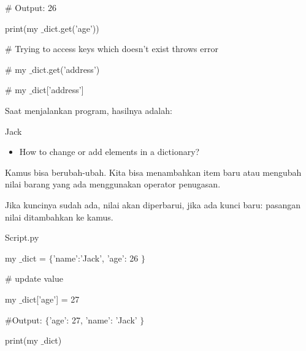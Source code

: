 \noindent 
 \hspace*{0.5in}  $  \#  $ Output: 26 \par
\noindent 
 \hspace*{0.5in} print(my $  \_  $dict.get('age')) \par
\noindent 
 \hspace*{0.5in}  $  \#  $ Trying to access keys which doesn't exist throws error \par
\noindent 
 \hspace*{0.5in}  $  \#  $ my $  \_  $dict.get('address') \par
\noindent 
 \hspace*{0.5in}  $  \#  $ my $  \_  $dict['address'] \par
\noindent 
Saat menjalankan program, hasilnya adalah: \par
\noindent 
Jack \par
{} \par
\vspace{12pt}
\noindent 
\begin{itemize}
	\item How to change or add elements in a dictionary? \par
\end{itemize}
\noindent 
Kamus bisa berubah-ubah. Kita bisa menambahkan item baru atau mengubah nilai barang yang ada menggunakan operator penugasan. \par
\noindent 
Jika kuncinya sudah ada, nilai akan diperbarui, jika ada kunci baru: pasangan nilai ditambahkan ke kamus. \par
\noindent 
Script.py \par
\noindent 
 \hspace*{0.5in} my $  \_  $dict =  $  \{  $'name':'Jack', 'age': 26 $  \}  $ \par
\vspace{12pt}
\noindent 
 \hspace*{0.5in}  $  \#  $ update value \par
\noindent 
 \hspace*{0.5in} my $  \_  $dict['age'] = 27 \par
\vspace{12pt}
\noindent 
 \hspace*{0.5in}  $  \#  $Output:  $  \{  $'age': 27, 'name': 'Jack' $  \}  $ \par
\noindent 
 \hspace*{0.5in} print(my $  \_  $dict) \par
\vspace{12pt}
